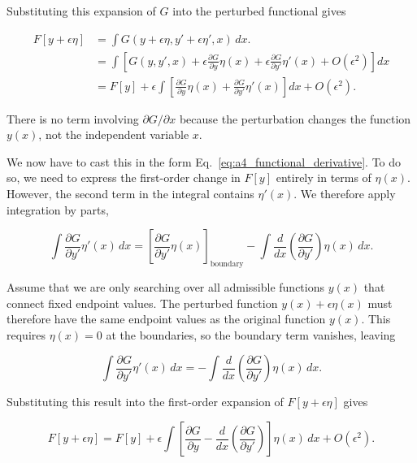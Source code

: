 \documentclass[10pt,twocolumn]{memoir}
\begin{document}
Substituting this expansion of $G$ into the perturbed functional gives

\begin{equation}
\begin{aligned}
    F[y+\epsilon\eta]
    &= \int G\left(y+\epsilon\eta, y'+\epsilon\eta', x\right)\,dx. \\
    &= \int \left[G(y,y',x) + \epsilon\frac{\partial G}{\partial y}\eta(x) + \epsilon\frac{\partial G}{\partial y'}\eta'(x) + O(\epsilon^2)\right]dx \\
    &= F[y] + \epsilon\int\left[\frac{\partial G}{\partial y}\eta(x) + \frac{\partial G}{\partial y'}\eta'(x)\right]dx + O(\epsilon^2).
\end{aligned}
\end{equation}

There is no term involving $\partial G/\partial x$ because the perturbation changes the function $y(x)$, not the independent variable $x$.

We now have to cast this in the form Eq.~\ref{eq:a4_functional_derivative}. To do so, we need to express the first-order change in $F[y]$ entirely in terms of $\eta(x)$. However, the second term in the integral contains $\eta'(x)$. We therefore apply integration by parts,

\begin{equation}
    \int\frac{\partial G}{\partial y'}\eta'(x)\,dx = \left[\frac{\partial G}{\partial y'}\eta(x)\right]_{\mathrm{boundary}} - \int\frac{d}{dx}\left(\frac{\partial G}{\partial y'}\right)\eta(x)\,dx.
\end{equation}

Assume that we are only searching over all admissible functions $y(x)$ that connect fixed endpoint values. The perturbed function $y(x)+\epsilon\eta(x)$ must therefore have the same endpoint values as the original function $y(x)$. This requires $\eta(x)=0$ at the boundaries, so the boundary term vanishes, leaving

\begin{equation}
    \int \frac{\partial G}{\partial y'}\eta'(x)\,dx = -\int\frac{d}{dx}\left(\frac{\partial G}{\partial y'}\right)\eta(x)\,dx.
\end{equation}

Substituting this result into the first-order expansion of $F[y+\epsilon\eta]$ gives

\begin{equation}
    F[y+\epsilon\eta] = F[y] + \epsilon\int\left[\frac{\partial G}{\partial y} - \frac{d}{dx}\left(\frac{\partial G}{\partial y'}\right)\right]\eta(x)\,dx + O(\epsilon^2).
\end{equation}
\end{document}
